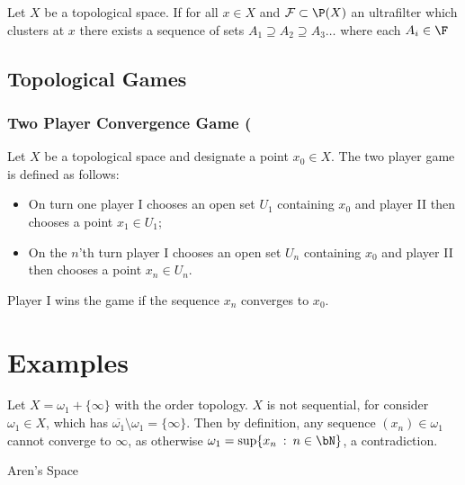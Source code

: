 \documentclass{article}
\begin{document}
\begin{defn}
    Let \(X\) be a topological space. If for all \(x \in X\) and \(\mathcal{F} \subset \P(X)\) an ultrafilter which clusters at \(x\) there exists a sequence of sets \(A_1 \supseteq A_2 \supseteq A_3 \dots\) where each \(A_i \in \F\)
\end{defn}





\subsection{Topological Games}
\subsubsection{Two Player Convergence Game (\texorpdfstring{\cite{GH76}})}
    Let \(X\) be a topological space and designate a point \(x_0 \in X\). The two player game is defined as follows: 
    \begin{itemize}
            \item On turn one player I chooses an open set \(U_1\) containing \(x_0\) and player II then chooses a point \(x_1 \in U_1\);
            \item On the \(n\)'th turn player I chooses an open set \(U_n\) containing \(x_0\) and player II then chooses a point \(x_n \in U_n\).
    \end{itemize}  
    Player I wins the game if the sequence \(x_n\) converges to \(x_0\).


    \cite{IF13}



\section{Examples}

\begin{exam}\cite{WL04}
    Let \(X = \omega_1 + \{\infty\}\) with the order topology. \(X\) is not sequential, for consider \(\omega_1 \in X\), which has \(\overline{\omega_1} \setminus \omega_1 = \{\infty\}\). Then by definition, any sequence \((x_n) \in \omega_1\) cannot converge to \(\infty\), as otherwise \(\omega_1 = \sup\{x_n \: : \: n \in \bN\}\), a contradiction.
\end{exam}

\begin{exam}{Aren's Space}
    
\end{exam}



\newpage

{}
\end{document}
